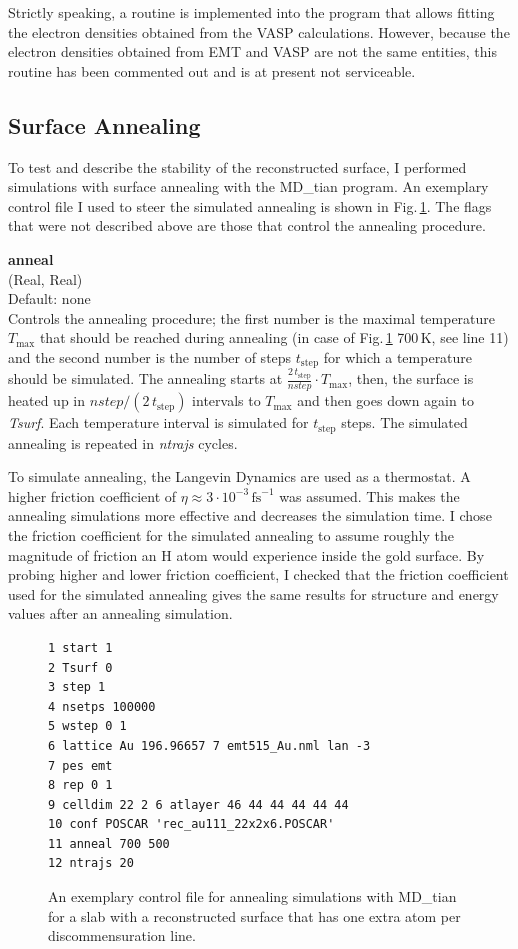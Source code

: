 \documentclass[twoside, 11pt, titlepage, captions=nooneline, a4paper, headsepline]{scrbook}%
\newcommand{\9}{\mathrm}
\newcommand{\0}{\,\mathrm}
\begin{document}
Strictly speaking, a routine is implemented into the program that allows fitting the electron densities obtained from the VASP calculations. However, because the electron densities obtained from EMT and VASP are not the same entities, this routine has been commented out and is at present not serviceable.

\subsection{Surface Annealing}
To test and describe the stability of the reconstructed surface, I performed simulations with surface annealing with the MD\_tian program. An exemplary control file I used to steer the simulated annealing is shown in Fig.\,\ref{Fig:mxt:anneal}. The flags that were not described above are those that control the annealing procedure.

\textbf{anneal}\\
(Real, Real)\\
Default: none\\
Controls the annealing procedure; the first number is the maximal temperature $T_\mathrm{max}$ that should be reached during annealing (in case of Fig.\,\ref{Fig:mxt:anneal} 700\,K, see line 11) and the second number is the number of steps $t_\mathrm{step}$ for which a temperature should be simulated.
The annealing starts at $\tfrac{2\,t_\mathrm{step}}{nstep} \cdot T_\mathrm{max}$, then, the surface is heated up in $nstep/(2\,t_\mathrm{step})$ intervals to $T_\mathrm{max}$ and then goes down again to \textit{Tsurf}. Each temperature interval is simulated for $t_\mathrm{step}$ steps. The simulated annealing is repeated in \textit{ntrajs} cycles.

To simulate annealing, the Langevin Dynamics are used as a thermostat. A higher friction coefficient of $\eta \approx 3\cdot10^{-3}$\,$\mathrm{fs}^{-1}$ was assumed. This makes the annealing simulations more effective and decreases the simulation time. I chose the friction coefficient for the simulated annealing to assume roughly the magnitude of friction an H atom would experience inside the gold surface. By probing higher and lower friction coefficient, I checked that the friction coefficient used for the simulated annealing gives the same results for structure and energy values after an annealing simulation.

\begin{figure}[b!]
\begin{verbatim}
1 start 1
2 Tsurf 0
3 step 1
4 nsetps 100000
5 wstep 0 1
6 lattice Au 196.96657 7 emt515_Au.nml lan -3
7 pes emt
8 rep 0 1
9 celldim 22 2 6 atlayer 46 44 44 44 44 44
10 conf POSCAR 'rec_au111_22x2x6.POSCAR'
11 anneal 700 500
12 ntrajs 20
\end{verbatim}
\caption{\label{Fig:mxt:anneal}An exemplary control file for annealing simulations with MD\_tian for a slab with a reconstructed surface that has one extra atom per discommensuration line.}
\end{figure}
\end{document}

